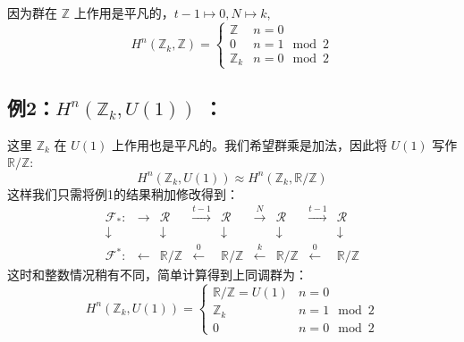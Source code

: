 \documentclass[UTF8]{ctexart}
\begin{document}
因为群在 $\mathbb{Z}$ 上作用是平凡的，$t-1\mapsto0,N\mapsto k$,
\begin{equation}
H^{n}\left(\mathbb{Z}_{k},\mathbb{Z}\right)=\begin{cases}
\mathbb{Z} & n=0\\
0 & n=1\mod2\\
\mathbb{Z}_{k} & n=0\mod2
\end{cases}
\end{equation}


\subsection*{例2：$H^{n}\left(\mathbb{Z}_{k},U\left(1\right)\right)$ ：}
\noindent
这里 $\mathbb{Z}_{k}$ 在 $U\left(1\right)$ 上作用也是平凡的。我们希望群乘是加法，因此将 $U(1)$
写作 $\mathbb{R}/\mathbb{Z}$:
\begin{equation}
H^{n}\left(\mathbb{Z}_{k},U\left(1\right)\right)\approx H^{n}\left(\mathbb{Z}_{k},\mathbb{R}/\mathbb{Z}\right)
\end{equation}
这样我们只需将例1的结果稍加修改得到：
\begin{equation}
\begin{array}{ccccccccc}
\mathcal{F}_{*}: & \rightarrow & \mathcal{R} & \stackrel{t-1}{\longrightarrow} & \mathcal{R} & \stackrel{N}{\longrightarrow} & \mathcal{R} & \stackrel{t-1}{\longrightarrow} & \mathcal{R}\\
\downarrow &  & \downarrow &  & \downarrow &  & \downarrow &  & \downarrow\\
\mathcal{F}^{*}: & \leftarrow & \mathbb{R}/\mathbb{Z} & \stackrel{0}{\longleftarrow} & \mathbb{R}/\mathbb{Z} & \stackrel{k}{\longleftarrow} & \mathbb{R}/\mathbb{Z} & \stackrel{0}{\longleftarrow} & \mathbb{R}/\mathbb{Z}
\end{array}
\end{equation}
这时和整数情况稍有不同，简单计算得到上同调群为：
\begin{equation}
H^{n}\left(\mathbb{Z}_{k},U\left(1\right)\right)=\begin{cases}
\mathbb{R}/\mathbb{Z}=U\left(1\right) & n=0\\
\mathbb{Z}_{k} & n=1\mod2\\
0 & n=0\mod2
\end{cases}
\end{equation}
\end{document}
